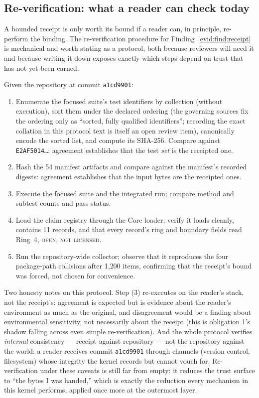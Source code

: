 \subsection{Re-verification: what a reader can check today}\label{evid:reverify}

A bounded receipt is only worth its bound if a reader can, in principle, re-perform the binding. The re-verification procedure for Finding~\ref{evid:find:receipt} is mechanical and worth stating as a protocol, both because reviewers will need it and because writing it down exposes exactly which steps depend on trust that has not yet been earned.

\begin{protocol}\label{evid:prot:reverify}
Given the repository at commit \texttt{a1cd9901}:
\begin{enumerate}
\item Enumerate the focused suite's test identifiers by collection (without execution), sort them under the declared ordering (the governing sources fix the ordering only as ``sorted, fully qualified identifiers''; recording the exact collation in this protocol text is itself an open review item), canonically encode the sorted list, and compute its SHA-256. Compare against \texttt{E2AF5014\ldots}: agreement establishes that the test \emph{set} is the receipted one.
\item Hash the 54 manifest artifacts and compare against the manifest's recorded digests: agreement establishes that the input bytes are the receipted ones.
\item Execute the focused suite and the integrated run; compare method and subtest counts and pass status.
\item Load the claim registry through the Core loader; verify it loads cleanly, contains 11 records, and that every record's ring and boundary fields read Ring~4, \textsc{open}, \textsc{not licensed}.
\item Run the repository-wide collector; observe that it reproduces the four package-path collisions after 1{,}200 items, confirming that the receipt's bound was forced, not chosen for convenience.
\end{enumerate}
\end{protocol}

Two honesty notes on this protocol. Step (3) re-executes on the reader's stack, not the receipt's: agreement is expected but is evidence about the reader's environment as much as the original, and disagreement would be a finding about environmental sensitivity, not necessarily about the receipt (this is obligation 1's shadow falling across even simple re-verification). And the whole protocol verifies \emph{internal} consistency --- receipt against repository --- not the repository against the world: a reader receives commit \texttt{a1cd9901} through channels (version control, filesystem) whose integrity the kernel records but cannot vouch for. Re-verification under these caveats is still far from empty: it reduces the trust surface to ``the bytes I was handed,'' which is exactly the reduction every mechanism in this kernel performs, applied once more at the outermost layer.

